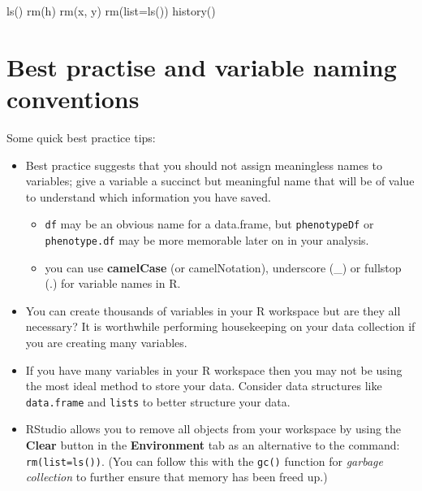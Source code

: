 \documentclass[a4paper]{book}
\newenvironment{Shaded}{}{}
\newcommand{\KeywordTok}[1]{\textcolor[rgb]{0.00,0.00,1.00}{{#1}}}
\newcommand{\DataTypeTok}[1]{{#1}}
\newcommand{\NormalTok}[1]{{#1}}
\providecommand{\tightlist}{%
  \setlength{\itemsep}{0pt}\setlength{\parskip}{0pt}}
\newlength{\leftbarwidth}
\newlength{\leftbarsep}
\newcommand*{\leftbarcolorcmd}{\color{darkgray}}%
\renewenvironment{leftbar}{%
    \def\FrameCommand{{\leftbarcolorcmd{\vrule width \leftbarwidth\relax\hspace {\leftbarsep}}}}%
    \MakeFramed {\advance \hsize -\width \FrameRestore }%
}{%
    \endMakeFramed
}
\renewenvironment{Shaded}
{\vspace{0em}\begin{leftbar}\begin{snugshade}}
{\end{snugshade}\end{leftbar}\vspace{0pt}}
\begin{document}
\begin{Shaded}
\begin{Highlighting}[]
\KeywordTok{ls}\NormalTok{()}
\KeywordTok{rm}\NormalTok{(h)}
\KeywordTok{rm}\NormalTok{(x, y)}
\KeywordTok{rm}\NormalTok{(}\DataTypeTok{list=}\KeywordTok{ls}\NormalTok{())}
\KeywordTok{history}\NormalTok{()}
\end{Highlighting}
\end{Shaded}

\section{Best practise and variable naming
conventions}\label{best-practise-and-variable-naming-conventions}

Some quick best practice tips:

\begin{itemize}
\item
  Best practice suggests that you should not assign meaningless names to
  variables; give a variable a succinct but meaningful name that will be
  of value to understand which information you have saved.

  \begin{itemize}
  \tightlist
  \item
    \texttt{df} may be an obvious name for a data.frame, but
    \texttt{phenotypeDf} or \texttt{phenotype.df} may be more memorable
    later on in your analysis.
  \item
    you can use \textbf{camelCase} (or camelNotation), underscore (\_)
    or fullstop (.) for variable names in R.
  \end{itemize}
\item
  You can create thousands of variables in your R workspace but are they
  all necessary? It is worthwhile performing housekeeping on your data
  collection if you are creating many variables.
\item
  If you have many variables in your R workspace then you may not be
  using the most ideal method to store your data. Consider data
  structures like \texttt{data.frame} and \texttt{lists} to better
  structure your data.
\item
  RStudio allows you to remove all objects from your workspace by using
  the \textbf{Clear} button in the \textbf{Environment} tab as an
  alternative to the command: \texttt{rm(list=ls())}. (You can follow
  this with the \texttt{gc()} function for \emph{garbage collection} to
  further ensure that memory has been freed up.)
\end{itemize}
\end{document}
